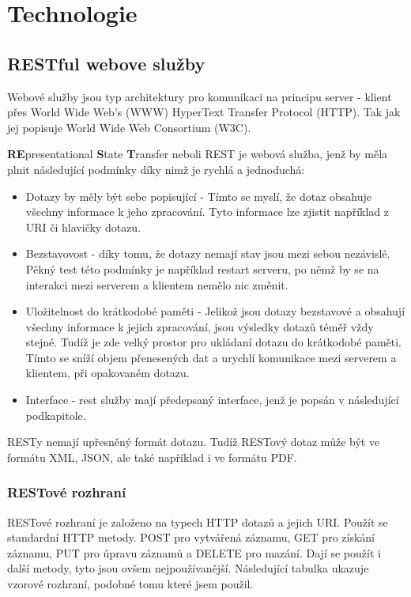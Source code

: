 \documentclass[czech,master,public,dept460,male,cpdeclaration,twoside]{diploma}
\begin{document}
%

\section{Technologie}

\subsection{RESTful webove služby}
Webové služby jsou typ architektury pro komunikaci na principu server - klient přes World Wide Web's (WWW) HyperText Transfer Protocol (HTTP). Tak jak jej popisuje World Wide Web Consortium (W3C). \cite{WebServices}

{\bf RE}presentational {\bf S}tate {\bf T}ransfer neboli REST je webová služba, jenž by měla plnit následující podmínky díky nimž je rychlá a jednoduchá: 
\begin{itemize}
	\item Dotazy by měly být sebe popisující - Tímto se myslí, že dotaz obsahuje všechny informace k jeho zpracování. Tyto informace lze zjistit například z URI či hlavičky dotazu.
	\item Bezstavovost - díky tomu, že dotazy nemají stav jsou mezi sebou nezávislé. Pěkný test této podmínky je například restart serveru, po němž by se na interakci mezi serverem a klientem nemělo nic změnit.
	\item Uložitelnost do krátkodobé paměti - Jelikož jsou dotazy bezstavové a obsahují všechny informace k jejich zpracování, jsou výsledky dotazů téměř vždy stejné. Tudíž je zde velký prostor pro ukládaní dotazu do krátkodobé paměti. Tímto se sníží objem přenesených dat a urychlí komunikace mezi serverem a klientem, při opakovaném dotazu. 
	\item Interface - rest služby mají předepsaný interface, jenž je popsán v následující podkapitole.
\end{itemize}
RESTy nemají upřesněný formát dotazu. Tudíž RESTový dotaz může být ve formátu XML, JSON, ale také například i ve formátu PDF. \cite{RESTWebServicesOracle} \cite{RESTWebServicesOracle2}

\subsubsection{RESTové rozhraní}
RESTové rozhraní je založeno na typech HTTP dotazů a jejich URI. Použít se standardní HTTP metody. POST pro vytvářená záznamu, GET pro získání záznamu, PUT pro úpravu záznamů a DELETE pro mazání. Dají se použít i další metody, tyto jsou ovšem nejpoužívanější. Následující tabulka ukazuje vzorové rozhraní, podobné tomu které jsem použil. \cite{RESTInterface}
\end{document}

